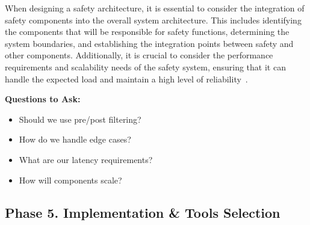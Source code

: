 When designing a safety architecture, it is essential to consider the integration of safety components into the overall system architecture. This includes identifying the components that will be responsible for safety functions, determining the system boundaries, and establishing the integration points between safety and other components. Additionally, it is crucial to consider the performance requirements and scalability needs of the safety system, ensuring that it can handle the expected load and maintain a high level of reliability~.

\textbf{Questions to Ask:}
\begin{itemize}
    \item Should we use pre/post filtering?
    \item How do we handle edge cases?
    \item What are our latency requirements?
    \item How will components scale?
\end{itemize}

\subsection{Phase 5. Implementation \& Tools Selection}

